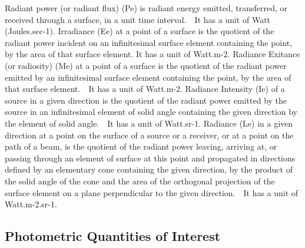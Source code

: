 Radiant power (or radiant flux) (Pe) is radiant energy emitted, transferred, or received through a surface, in a unit time interval.   It has a unit of Watt (Joules.sec-1).
Irradiance (Ee) at a point of a surface is the quotient of the radiant power incident on an infinitesimal surface element containing the point, by the area of that surface element. It has a unit of Watt.m-2.
Radiance Exitance (or radiosity) (Me) at a point of a surface is the quotient of the radiant power emitted by an infinitesimal surface element containing the point, by the area of that surface element.   It has a unit of Watt.m-2. 
Radiance Intensity (Ie) of a source in a given direction is the quotient of the radiant power emitted by the source in an infinitesimal element of solid angle containing the given direction by the element of solid angle.   It has a unit of Watt.sr-1.
Radiance (Le) in a given direction at a point on the surface of a source or a receiver, or at a point on the path of a beam, is the quotient of the radiant power leaving, arriving at, or passing through an element of surface at this point and propagated in directions defined by an elementary cone containing the given direction, by the product of the solid angle of the cone and the area of the orthogonal projection of the surface element on a plane perpendicular to the given direction.   It has a unit of Watt.m-2.sr-1.

\subsection{Photometric Quantities of Interest}

